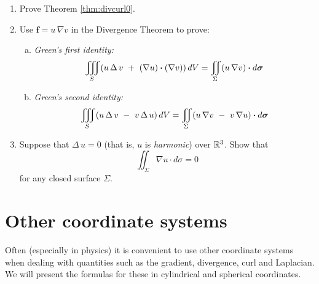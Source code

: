 \begin{enumerate}[\bfseries 1.]
[{[\bfseries 1.]}]
 \item Prove Theorem \ref{thm:divcurl0}.
 \item Use $\mathbf{f} = u\,\nabla v$ in the Divergence Theorem to prove:
  \begin{enumerate}[(a)]
   \item \emph{Green's first identity:}
    \[\iiint_{S} (u\,\Delta\,v ~+~ (\nabla u) \bm{\cdot} (\nabla v))\,dV =
    \iint_{\Sigma} (u\,\nabla v) \bm{\cdot} d\bm{\sigma}\]
   \item \emph{Green's second identity:}
    \[\iiint_{S} (u\,\Delta\,v ~-~ v\,\Delta\,u)\,dV =
    \iint_{\Sigma} (u\,\nabla v ~-~ v\,\nabla u) \bm{\cdot} d\bm{\sigma}\]
  \end{enumerate}
 \item Suppose that $\Delta\,u = 0$ (that is, $u$ is \emph{harmonic}) over $\mathbb{R}^{3}$.  
  Show that 
  \[\iint_{\Sigma} \nabla u\cdot d\sigma = 0\]
  for any closed surface $\Sigma$.
\end{enumerate}

\section{Other coordinate systems}

Often (especially in physics) it is convenient to use other coordinate systems when dealing with quantities such as the
gradient, divergence, curl and Laplacian. 
We will present the formulas for these in cylindrical and spherical
coordinates.

